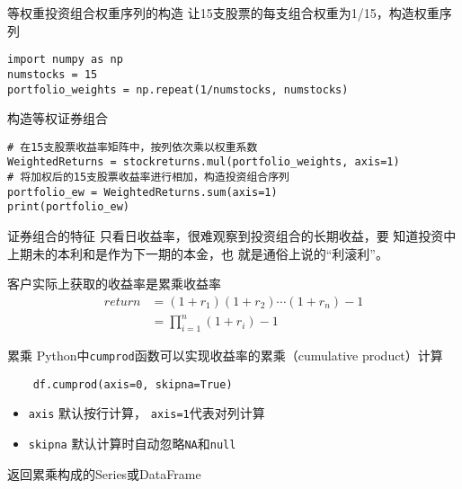\documentclass[t]{beamer}
\begin{document}
\begin{frame}[fragile]{等权重投资组合权重序列的构造}
    让15支股票的每支组合权重为1/15，构造权重序列
\begin{lstlisting}
import numpy as np
numstocks = 15  
portfolio_weights = np.repeat(1/numstocks, numstocks) 
\end{lstlisting}
\end{frame}


\begin{frame}[fragile]{构造等权证券组合}
\begin{lstlisting}
# 在15支股票收益率矩阵中，按列依次乘以权重系数 
WeightedReturns = stockreturns.mul(portfolio_weights, axis=1) 
# 将加权后的15支股票收益率进行相加，构造投资组合序列
portfolio_ew = WeightedReturns.sum(axis=1) 
print(portfolio_ew)
\end{lstlisting}
\begin{center}
\end{center}
\end{frame}


\begin{frame}[fragile]{证券组合的特征}
只看日收益率，很难观察到投资组合的长期收益，要 知道投资中上期未的本利和是作为下一期的本金，也 就是通俗上说的“利滚利”。

客户实际上获取的收益率是累乘收益率
\[\begin{split}
    return &= (1+r_1)(1+r_2)\cdots(1+r_n)-1\\
&=\prod^{n}_{i=1}(1+r_i) -1
\end{split} \]

\end{frame}




\begin{frame}[fragile]{累乘}
    Python中\verb|cumprod|函数可以实现收益率的累乘（{\color{red}cum}ulative {\color{red}prod}uct）计算

\begin{lstlisting}
    df.cumprod(axis=0, skipna=True)
\end{lstlisting}

\begin{itemize}
    \item \verb|axis| 默认按行计算， \verb|axis=1|代表对列计算
    \item \verb|skipna| 默认计算时自动忽略\verb|NA|和\verb|null|
\end{itemize}
返回累乘构成的Series或DataFrame

\end{frame}
\end{document}
